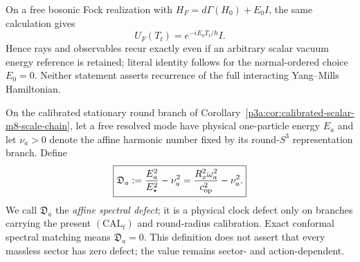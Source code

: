\documentclass[12pt,a4paper]{article}
\begin{document}
\begin{remark}
On a free bosonic Fock realization with
\(H_F=d\Gamma(H_0)+E_0I\), the same calculation gives
\[
 U_F(T_t)=e^{-iE_0T_t/\hbar}I.
\]
Hence rays and observables recur exactly even if an arbitrary scalar vacuum
energy reference is retained; literal identity follows for the normal-ordered
choice \(E_0=0\).  Neither statement asserts recurrence of the full interacting
Yang--Mills Hamiltonian.
\end{remark}



\begin{definition}
\label{p3a:def:v247-affine-spectral-defect}
On the calibrated stationary round branch of
Corollary~\ref{p3a:cor:calibrated-scalar-m8-scale-chain}, let a free resolved
mode have physical one-particle energy \(E_a\) and let \(\nu_a>0\) denote the
affine harmonic number fixed by its round-\(S^3\) representation branch.  Define
\[
 \boxed{\mathfrak D_a
 :=\frac{E_a^2}{E_\star^2}-\nu_a^2
 =\frac{R_x^2\omega_a^2}{c_{\rm op}^2}-\nu_a^2.}
\]
We call \(\mathfrak D_a\) the \emph{affine spectral defect}; it is a physical
clock defect only on branches carrying the present \((\mathrm{CAL}_t)\) and
round-radius calibration.  Exact conformal spectral matching means
\(\mathfrak D_a=0\).  This definition does not assert that every massless
sector has zero defect; the value remains sector- and action-dependent.
\end{definition}
\end{document}
